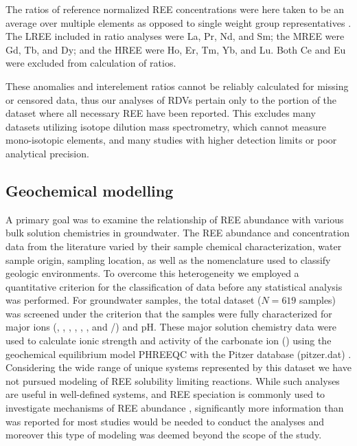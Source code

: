 The ratios of reference normalized REE concentrations were here taken to be an average over multiple elements as opposed to single weight group representatives \citep{Stolpe_GCA_2013}.
The LREE included in ratio analyses were La, Pr, Nd, and Sm; the MREE were Gd, Tb, and Dy; and the HREE were Ho, Er, Tm, Yb, and Lu.
Both Ce and Eu were excluded from calculation of ratios.

These anomalies and interelement ratios cannot be reliably calculated for missing or censored data, thus our analyses of RDVs pertain only to the portion of the dataset where all necessary REE have been reported.
This excludes many datasets utilizing isotope dilution mass spectrometry, which cannot measure mono-isotopic elements, and many studies with higher detection limits or poor analytical precision.

\subsection{Geochemical modelling}

A primary goal was to examine the relationship of REE abundance with various bulk solution chemistries in groundwater.
The REE abundance and concentration data from the literature varied by their sample chemical characterization, water sample origin, sampling location, as well as the nomenclature used to classify geologic environments.
To overcome this heterogeneity we employed a quantitative criterion for the classification of data before any statistical analysis was performed.
For groundwater samples, the total dataset ($N = 619$ samples) was screened under the criterion that the samples were fully characterized for major ions (, , , , , , and /) and pH.
These major solution chemistry data were used to calculate ionic strength and activity of the carbonate ion () using the geochemical equilibrium model PHREEQC with the Pitzer database (pitzer.dat) \citep{PHREEQC, PitzerI}.
Considering the wide range of unique systems represented by this dataset we have not pursued modeling of REE solubility limiting reactions.
While such analyses are useful in well-defined systems, and REE speciation is commonly used to investigate mechanisms of REE abundance \citep{Willis_CG_2011, Johannesson_CG_1996, Johannesson_AG_1995},
significantly more information than was reported for most studies would be needed to conduct the analyses and moreover this type of modeling was deemed beyond the scope of the study.

